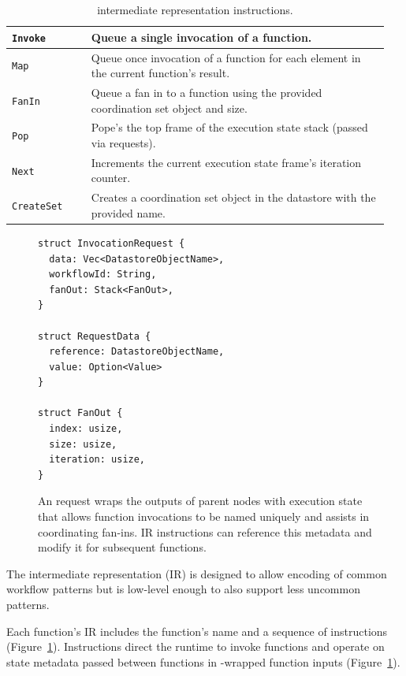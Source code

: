 \begin{table}[t]
  \centering
  \begin{tabular}{|m{0.2\linewidth}|m{0.75\linewidth}|}
    \hline
  \texttt{Invoke} & Queue a single invocation of a function.\\
    \hline
  \texttt{Map} & Queue once invocation of a function for each element in the current function's result.\\
    \hline
  \texttt{FanIn} & Queue a fan in to a function using the provided coordination set object and size.\\
    \hline
  \texttt{Pop} & Pope's the top frame of the execution state stack (passed via \name{} requests). \\
    \hline
  \texttt{Next} & Increments the current execution state frame's iteration counter.\\
    \hline
  \texttt{CreateSet} & Creates a coordination set object in the datastore with the provided name.\\
    \hline
  \end{tabular}
  \caption{\name{} intermediate representation instructions.}
  \label{table:design:irschema}
\end{table}

\begin{figure}[t]
    \centering
    \begin{verbatim}
struct InvocationRequest {
  data: Vec<DatastoreObjectName>,
  workflowId: String,
  fanOut: Stack<FanOut>,
}

struct RequestData {
  reference: DatastoreObjectName,
  value: Option<Value>
}

struct FanOut {
  index: usize,
  size: usize,
  iteration: usize,
}
    \end{verbatim}
    \caption{An \name{} request wraps the outputs of parent nodes with execution
state that allows function invocations to be named uniquely and assists in
coordinating fan-ins. \name{} IR instructions can reference this metadata and
modify it for subsequent functions.}
    \label{fig:design:unum-request}
\end{figure}

The \name{} intermediate representation (IR) is designed to allow encoding of
common workflow patterns but is low-level enough to also support less uncommon
patterns.

Each function's IR includes the function's name and a sequence of instructions
(Figure~\ref{table:design:irschema}). Instructions direct the runtime to invoke
functions and operate on state metadata passed between functions in
\name{}-wrapped function inputs (Figure~\ref{fig:design:unum-request}).

